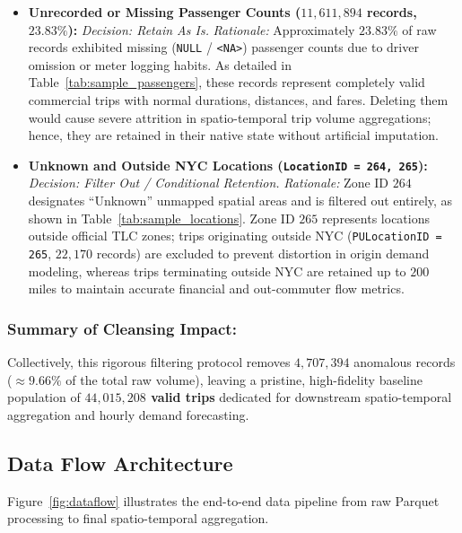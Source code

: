 \documentclass[11pt,a4paper]{article}
\begin{document}
\begin{itemize}
    \item \textbf{Unrecorded or Missing Passenger Counts ($11,611,894$ records, $23.83\%$):} 
    \textit{Decision: Retain As Is.} 
    \textit{Rationale:} Approximately $23.83\%$ of raw records exhibited missing (\texttt{NULL} / \texttt{<NA>}) passenger counts due to driver omission or meter logging habits. As detailed in Table~\ref{tab:sample_passengers}, these records represent completely valid commercial trips with normal durations, distances, and fares. Deleting them would cause severe attrition in spatio-temporal trip volume aggregations; hence, they are retained in their native state without artificial imputation.
    
    \item \textbf{Unknown and Outside NYC Locations (\texttt{LocationID = 264, 265}):} 
    \textit{Decision: Filter Out / Conditional Retention.} 
    \textit{Rationale:} Zone ID $264$ designates ``Unknown'' unmapped spatial areas and is filtered out entirely, as shown in Table~\ref{tab:sample_locations}. Zone ID $265$ represents locations outside official TLC zones; trips originating outside NYC (\texttt{PULocationID = 265}, $22,170$ records) are excluded to prevent distortion in origin demand modeling, whereas trips terminating outside NYC are retained up to $200$ miles to maintain accurate financial and out-commuter flow metrics.
\end{itemize}

\subsubsection{Summary of Cleansing Impact:}
Collectively, this rigorous filtering protocol removes $4,707,394$ anomalous records ($\approx 9.66\%$ of the total raw volume), leaving a pristine, high-fidelity baseline population of \textbf{$44,015,208$ valid trips} dedicated for downstream spatio-temporal aggregation and hourly demand forecasting.

\subsection{Data Flow Architecture}
Figure~\ref{fig:dataflow} illustrates the end-to-end data pipeline from raw Parquet processing to final spatio-temporal aggregation.
\end{document}
